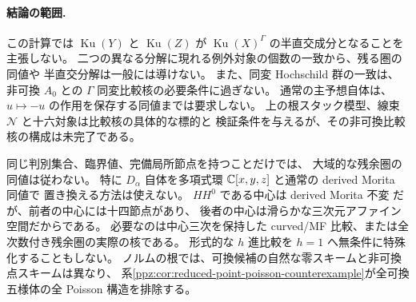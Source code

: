 \paragraph{結論の範囲.}
この計算では $\operatorname{Ku}(Y)$ と $\operatorname{Ku}(Z)$ が
$\operatorname{Ku}(X)^\Gamma$ の半直交成分となることを主張しない。
二つの異なる分解に現れる例外対象の個数の一致から、残る圏の同値や
半直交分解は一般には導けない。
また、同変 Hochschild 群の一致は、非可換 $A_0$ との
$\Gamma$ 同変比較核の必要条件に過ぎない。
通常の主予想自体は、$u\mapsto-u$ の作用を保存する同値までは要求しない。
上の根スタック模型、線束 $\mathcal N$ と十六対象は比較核の具体的な標的と
検証条件を与えるが、その非可換比較核の構成は未完了である。

\begin{remark}[比較の残る入力]
同じ判別集合、臨界値、完備局所節点を持つことだけでは、
大域的な残余圏の同値は従わない。
特に $D_\alpha$ 自体を多項式環 $\mathbb C[x,y,z]$ と通常の derived Morita 同値で
置き換える方法は使えない。
$HH^0$ である中心は derived Morita 不変
\cite[\S3.2]{CMOKellerHochschild}だが、前者の中心には十四節点があり、
後者の中心は滑らかな三次元アファイン空間だからである。
必要なのは中心三次を保持した curved/MF 比較、または全次数付き残余圏の実際の核である。
形式的な $h$ 進比較を $h=1$ へ無条件に特殊化することもしない。
ノルムの根では、可換候補の自然な零スキームと非可換点スキームは異なり、
系\ref{ppz:cor:reduced-point-poisson-counterexample}が全可換五様体の全 Poisson 構造を排除する。
\end{remark}
